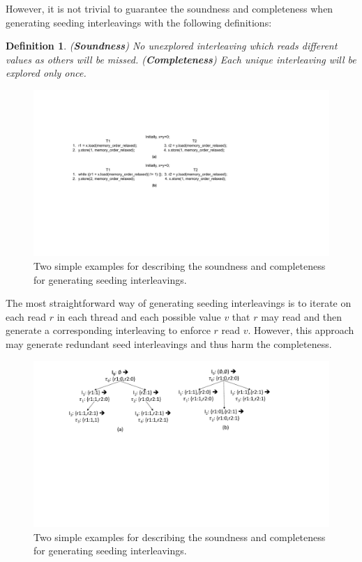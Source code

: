\documentclass[preprint, numbers, 10pt]{sigplanconf}
\newtheorem{definition}{Definition}
\begin{document}
However, it is not trivial to guarantee the soundness and completeness when generating
seeding interleavings with the following definitions:
\begin{definition}
(\textbf{Soundness}) No unexplored interleaving which reads different values as others will be missed.
(\textbf{Completeness}) Each unique interleaving will be explored only once.
\end{definition}

\begin{figure}%
\centering\includegraphics[scale=0.45]{soundnessCompleteness.pdf} %
\caption{Two simple examples for describing the soundness and completeness for
generating seeding interleavings.}
\label{fig:soundComplete}
\end{figure}

The most straightforward way of generating seeding interleavings is to iterate on each read $r$ 
in each thread and each possible value $v$ that $r$ may read and 
then generate a corresponding interleaving to enforce $r$ read $v$. 
However, this approach may generate redundant seed interleavings and thus harm the completeness. 

\begin{figure}%
\centering\includegraphics[scale=0.35]{interleavingGen.pdf} %
\caption{Two simple examples for describing the soundness and completeness for
generating seeding interleavings.}
\label{fig:interleavingGen}
\end{figure}
\end{document}
